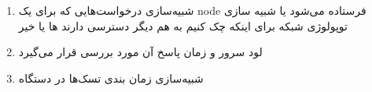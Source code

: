 \begin{enumerate}
    \item شبیه‌سازی درخواست‌هایی که برای یک node فرستاده می‌شود یا شبیه سازی توپولوژی شبکه برای اینکه چک کنیم به هم دیگر دسترسی دارند ها یا خیر
    \item لود سرور‌ و زمان پاسخ آن مورد بررسی قرار می‌گیرد
    \item شبیه‌سازی زمان بندی تسک‌ها در دستگاه
\end{enumerate}